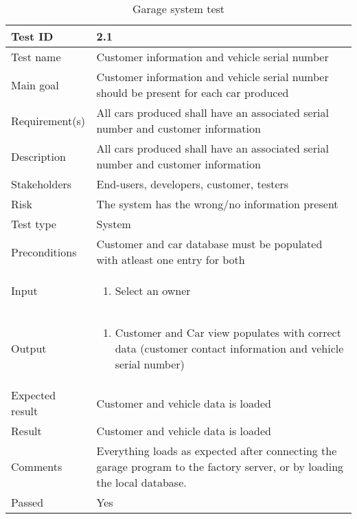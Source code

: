 \begin{table}[H]
\centering
\caption{Garage system test}
\begin{tabularx}{1.0\textwidth}{
    |p{}     %
    |p{}|    %
}
\hline

Test ID
& 2.1
\\
\hline

Test name
& Customer information and vehicle serial number
\\
\hline

Main goal
& Customer information and vehicle serial number should be present for each car produced
\\
\hline

Requirement(s)
& All cars produced shall have an associated serial number and customer information
\\
\hline

Description
& All cars produced shall have an associated serial number and customer information
\\
\hline

Stakeholders
& End-users, developers, customer, testers
\\
\hline

Risk
& The system has the wrong/no information present
\\
\hline

Test type
& System
\\
\hline

Preconditions
& Customer and car database must be populated with atleast one entry for both
\\
\hline

Input
& \begin{enumerate}
    \item Select an owner
\end{enumerate}
\\
\hline

Output
& \begin{enumerate}
    \item Customer and Car view populates with correct data (customer contact information and vehicle serial number)
\end{enumerate}
\\
\hline

Expected result
& Customer and vehicle data is loaded
\\
\hline

Result
& Customer and vehicle data is loaded
\\
\hline

Comments
& Everything loads as expected after connecting the garage program to the factory server, or by loading the local database.
\\
\hline

Passed
& Yes
\\
\hline

\end{tabularx}
\end{table}

